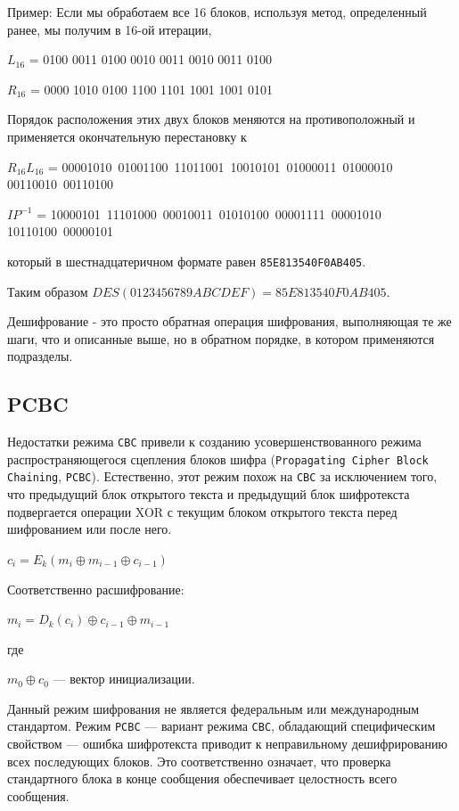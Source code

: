 Пример: Если мы обработаем все 16 блоков, используя метод, определенный ранее, мы получим в 16-ой итерации,

$L_{16}$ = 0100 0011 0100 0010 0011 0010 0011 0100

$R_{16}$ = 0000 1010 0100 1100 1101 1001 1001 0101

Порядок расположения этих двух блоков меняются на противоположный и применяется окончательную перестановку к

$R_{16} L_{16}$ = 00001010\ 01001100\ 11011001\ 10010101\ 01000011\ 01000010\\ 00110010\ 00110100

$IP^{-1}$ = 10000101\ 11101000\ 00010011\ 01010100\ 00001111\ 00001010\\ 10110100\ 00000101

который в шестнадцатеричном формате равен \texttt{85E813540F0AB405}.

Таким образом $DES(0123456789ABCDEF) = 85E813540F0AB405$.

Дешифрование - это просто обратная операция шифрования, выполняющая те же шаги, что и описанные выше, но в обратном порядке, в котором применяются подразделы.

\subsection{PCBC}

Недостатки режима \texttt{CBC} привели к созданию усовершенствованного режима распространяющегося сцепления блоков шифра (\texttt{Propagating Cipher Block Chaining}, \texttt{PCBC}). 
Естественно, этот режим похож на \texttt{CBC} за исключением того, что предыдущий блок открытого текста и предыдущий блок шифротекста подвергается операции XOR с текущим блоком открытого текста перед шифрованием или после него.

$c_{i}=E_{k}\left(m_{{i}}\oplus m_{{i-1}}\oplus c_{{i-1}}\right)$

Соответственно расшифрование:

$m_{i}=D_{k}(c_{{i}})\oplus c_{{i-1}}\oplus m_{{i-1}}$

где 

$m_{{0}}\oplus c_{{0}}$ — вектор инициализации.

Данный режим шифрования не является федеральным или международным стандартом. 
Режим \texttt{PCBC} --- вариант режима \texttt{CBC}, обладающий специфическим свойством --- ошибка шифротекста приводит к неправильному дешифрированию всех последующих блоков. 
Это соответственно означает, что проверка стандартного блока в конце сообщения обеспечивает целостность всего сообщения. 

